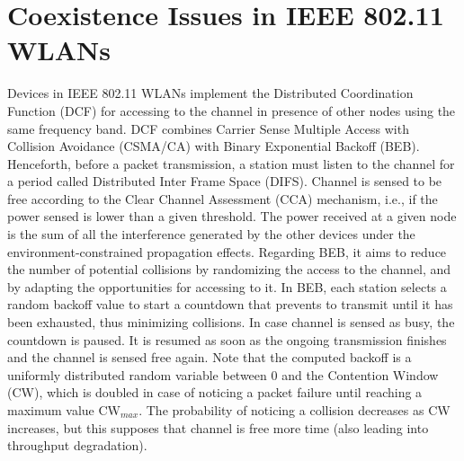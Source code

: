 \documentclass[12pt, a4paper,twoside]{tesi_upf}
\begin{document}
		\section{Coexistence Issues in IEEE 802.11 WLANs}
		\label{section:coexistence_issues}	
			Devices in IEEE 802.11 WLANs implement the Distributed Coordination Function (DCF) for accessing to the channel in presence of other nodes using the same frequency band. DCF combines Carrier Sense Multiple Access with Collision Avoidance (CSMA/CA) with Binary Exponential Backoff (BEB). Henceforth, before a packet transmission, a station must listen to the channel for a period called Distributed Inter Frame Space (DIFS). Channel is sensed to be free according to the Clear Channel Assessment (CCA) mechanism, i.e., if the power sensed is lower than a given threshold. The power received at a given node is the sum of all the interference generated by the other devices under the environment-constrained propagation effects. Regarding BEB, it aims to reduce the number of potential collisions by randomizing the access to the channel, and by adapting the opportunities for accessing to it. In BEB, each station selects a random backoff value to start a countdown that prevents to transmit until it has been exhausted, thus minimizing collisions. In case channel is sensed as busy, the countdown is paused. It is resumed as soon as the ongoing transmission finishes and the channel is sensed free again. Note that the computed backoff is a uniformly distributed random variable between 0 and the Contention Window (CW), which is doubled in case of noticing a packet failure until reaching a maximum value $\text{CW}_{max}$. The probability of noticing a collision decreases as CW increases, but this supposes that channel is free more time (also leading into throughput degradation).
					
\end{document}
